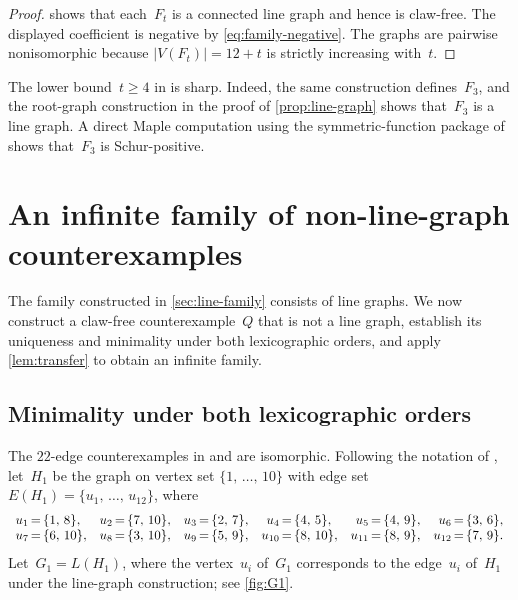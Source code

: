 \documentclass[11pt]{amsart}
\numberwithin{equation}{section}
\theoremstyle{remark}
\newcommand{\Gone}{G_{1}}
\newcommand{\Ft}{F_t}
\begin{document}
\begin{proof}
 shows that each~$\Ft$ is a connected line graph and
hence is claw-free.  The displayed coefficient is negative
by \eqref{eq:family-negative}.  The graphs are pairwise nonisomorphic because
$\lvert V(\Ft)\rvert=12+t$ is strictly increasing with~$t$.
\end{proof}

The lower bound~$t\ge4$ in  is sharp.  Indeed, the
same construction defines~$F_3$, and the root-graph construction in the
proof of \cref{prop:line-graph} shows that~$F_3$ is a line graph.  A direct
Maple computation using the symmetric-function package of
\citet{Stembridge1995} shows that~$F_3$ is Schur-positive.


\section{An infinite family of non-line-graph counterexamples}
\label{sec:nonline-family}

The family constructed in \cref{sec:line-family} consists of line graphs.
We now construct a claw-free counterexample~$Q$ that is not a line graph,
establish its uniqueness and minimality under both lexicographic orders,
and apply \cref{lem:transfer} to obtain an infinite family.

\subsection{Minimality under both lexicographic orders}
\label{subsec:nonline-minimality}

The $22$-edge counterexamples in
\citet[Theorem~1]{Prajapati2026} and \citet{MM2026} are isomorphic.
Following the notation of \citet{MM2026}, let~$H_1$ be the graph on
vertex set
$\{1,\,\dots,\,10\}$ with edge set
$E(H_1)=\{u_1,\,\dots,\,u_{12}\}$, where
\[
\begin{array}{r@{\,=\,}l r@{\,=\,}l r@{\,=\,}l r@{\,=\,}l
                r@{\,=\,}l r@{\,=\,}l}
u_1 & \{1,\,8\}, & u_2 & \{7,\,10\}, & u_3 & \{2,\,7\}, &
u_4 & \{4,\,5\}, & u_5 & \{4,\,9\}, & u_6 & \{3,\,6\},\\
u_7 & \{6,\,10\}, & u_8 & \{3,\,10\}, & u_9 & \{5,\,9\}, &
u_{10} & \{8,\,10\}, & u_{11} & \{8,\,9\}, &
u_{12} & \{7,\,9\}.
\end{array}
\]
Let~$\Gone=L(H_1)$, where the vertex~$u_i$ of~$\Gone$ corresponds to the
edge~$u_i$ of~$H_1$ under the line-graph construction; see
\cref{fig:G1}.  
\end{document}
